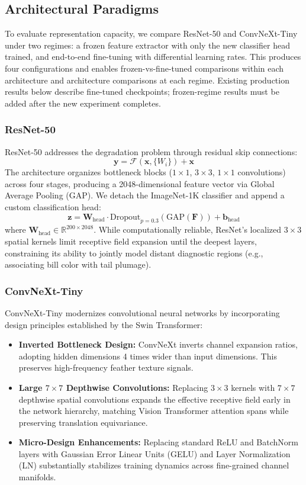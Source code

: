 \documentclass[10pt,twocolumn,letterpaper]{article}
\begin{document}
\subsection{Architectural Paradigms}
To evaluate representation capacity, we compare ResNet-50 and ConvNeXt-Tiny under two regimes: a frozen feature extractor with only the new classifier head trained, and end-to-end fine-tuning with differential learning rates. This produces four configurations and enables frozen-vs-fine-tuned comparisons within each architecture and architecture comparisons at each regime. Existing production results below describe fine-tuned checkpoints; frozen-regime results must be added after the new experiment completes.

\subsubsection{ResNet-50}
ResNet-50 addresses the degradation problem through residual skip connections:
\begin{equation}
    \mathbf{y} = \mathcal{F}(\mathbf{x}, \{W_i\}) + \mathbf{x}
\end{equation}
The architecture organizes bottleneck blocks ($1\times1$, $3\times3$, $1\times1$ convolutions) across four stages, producing a 2048-dimensional feature vector via Global Average Pooling (GAP). We detach the ImageNet-1K classifier and append a custom classification head:
\begin{equation}
    \mathbf{z} = \mathbf{W}_{\text{head}} \cdot \text{Dropout}_{p=0.3}(\text{GAP}(\mathbf{F})) + \mathbf{b}_{\text{head}}
\end{equation}
where $\mathbf{W}_{\text{head}} \in \mathbb{R}^{200 \times 2048}$. While computationally reliable, ResNet's localized $3\times3$ spatial kernels limit receptive field expansion until the deepest layers, constraining its ability to jointly model distant diagnostic regions (e.g., associating bill color with tail plumage).

\subsubsection{ConvNeXt-Tiny}
ConvNeXt-Tiny modernizes convolutional neural networks by incorporating design principles established by the Swin Transformer:
\begin{itemize}
    \item \textbf{Inverted Bottleneck Design:} ConvNeXt inverts channel expansion ratios, adopting hidden dimensions 4 times wider than input dimensions. This preserves high-frequency feather texture signals.
    \item \textbf{Large $7\times7$ Depthwise Convolutions:} Replacing $3\times3$ kernels with $7\times7$ depthwise spatial convolutions expands the effective receptive field early in the network hierarchy, matching Vision Transformer attention spans while preserving translation equivariance.
    \item \textbf{Micro-Design Enhancements:} Replacing standard ReLU and BatchNorm layers with Gaussian Error Linear Units (GELU) and Layer Normalization (LN) substantially stabilizes training dynamics across fine-grained channel manifolds.
\end{itemize}
\end{document}
